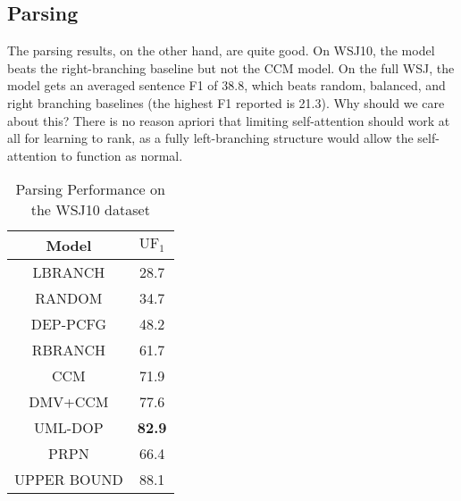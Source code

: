 \documentclass{article}
\begin{document}
\subsection{Parsing}
The parsing results, on the other hand, are quite good.
On WSJ10, the model beats the right-branching baseline but not the CCM model.
On the full WSJ, the model gets an averaged sentence F1 of 38.8,
which beats random, balanced, and right branching baselines
(the highest F1 reported is 21.3).
Why should we care about this?
There is no reason apriori that limiting self-attention should work at all
for learning to rank, as a fully left-branching structure would
allow the self-attention to function as normal. 

\begin{table}[h!]                                    
\centering
  \begin{tabular}{ c c }
    \toprule[2pt]
    Model & $\mathrm{UF}_1$ \\
    \hline
    LBRANCH &  28.7 \\
    RANDOM & 34.7 \\
    DEP-PCFG \citep{carroll1992two} & 48.2 \\
    RBRANCH & 61.7 \\
    CCM \citep{klein2002generative} & 71.9 \\
    DMV+CCM \citep{klein2005natural} & 77.6 \\
    UML-DOP \citep{bod2006all} & \textbf{82.9} \\
    \hline
    PRPN & 66.4 \\
    \hline                                          
    UPPER BOUND & 88.1 \\                           
    \toprule[2pt]                                   
  \end{tabular}                                     
  \caption{Parsing Performance on the WSJ10 dataset}
  \label{tb_parser}                                 
\end{table}                                         
\end{document}
